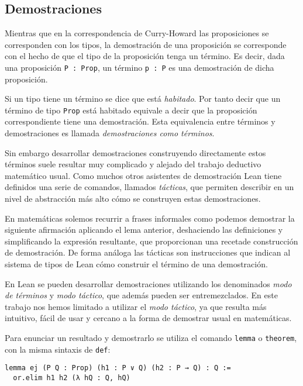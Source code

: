 \subsection{Demostraciones}

Mientras que en la correspondencia de Curry-Howard las proposiciones se
corresponden con los tipos, la demostración de una proposición se corresponde
con el hecho de que el tipo de la proposición tenga un término. Es decir, dada
una proposición \lstinline{P : Prop}, un término \lstinline{p : P} es una
demostración de dicha proposición.

Si un tipo tiene un término se dice que está \textit{habitado}. Por tanto decir
que un término de tipo \lstinline{Prop} está habitado equivale a decir que la
proposición correspondiente tiene una demostración. Esta equivalencia entre
términos y demostraciones es llamada \textit{demostraciones como términos}.

Sin embargo desarrollar demostraciones construyendo directamente estos términos
suele resultar muy complicado y alejado del trabajo deductivo matemático usual.
Como muchos otros asistentes de demostración Lean tiene definidos una
serie de comandos, llamados \textit{tácticas}, que permiten describir en un
nivel de abstracción más alto cómo se construyen estas demostraciones.

En matemáticas solemos recurrir a frases informales como \guillemotleft podemos
demostrar la siguiente afirmación aplicando el lema anterior, deshaciendo las
definiciones y simplificando la expresión resultante\guillemotright, que
proporcionan una \guillemotleft receta\guillemotright de construcción de
demostración. De forma análoga las tácticas son instrucciones que indican al
sistema de tipos de Lean cómo construir el término de una demostración.

En Lean se pueden desarrollar demostraciones utilizando los denominados
\textit{modo de términos} y \textit{modo táctico}, que además pueden ser
entremezclados. En este trabajo nos hemos limitado a utilizar el  \textit{modo
	táctico}, ya que resulta más intuitivo, fácil de usar y cercano a la forma de
demostrar usual en matemáticas.

Para enunciar un resultado y demostrarlo se utiliza el comando \lstinline{lemma}
o \lstinline{theorem}, con la misma sintaxis de \lstinline{def}:

\begin{lstlisting}
lemma ej (P Q : Prop) (h1 : P ∨ Q) (h2 : P → Q) : Q :=
  or.elim h1 h2 (λ hQ : Q, hQ)
\end{lstlisting}

